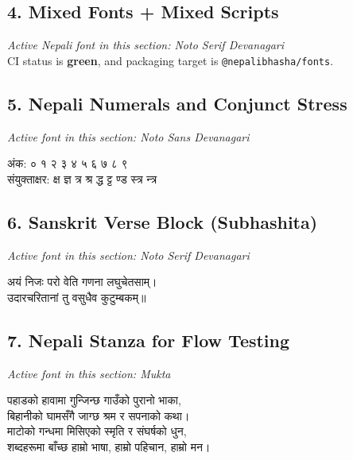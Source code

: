 \documentclass{article}
\begin{document}
\subsection*{4. Mixed Fonts + Mixed Scripts}
\textit{Active Nepali font in this section: Noto Serif Devanagari}\\
{\nepaliserif
{}}
CI status is \textbf{green}, and packaging target is
\texttt{@nepalibhasha/fonts}.

\subsection*{5. Nepali Numerals and Conjunct Stress}
\textit{Active font in this section: Noto Sans Devanagari}\\
\begin{nepali}
अंक: ० १ २ ३ ४ ५ ६ ७ ८ ९\\
संयुक्ताक्षर: क्ष ज्ञ त्र श्र द्ध ट्ट ण्ड स्त्र न्त्र
\end{nepali}

\subsection*{6. Sanskrit Verse Block (Subhashita)}
\textit{Active font in this section: Noto Serif Devanagari}\\
{\nepaliserif
\begin{nepali}
अयं निजः परो वेति गणना लघुचेतसाम्।\\
उदारचरितानां तु वसुधैव कुटुम्बकम्॥
\end{nepali}
}

\subsection*{7. Nepali Stanza for Flow Testing}
\textit{Active font in this section: Mukta}\\
{\nepalimukta
\begin{nepali}
पहाडको हावामा गुन्जिन्छ गाउँको पुरानो भाका,\\
बिहानीको घामसँगै जाग्छ श्रम र सपनाको कथा।\\
माटोको गन्धमा मिसिएको स्मृति र संघर्षको धुन,\\
शब्दहरूमा बाँच्छ हाम्रो भाषा, हाम्रो पहिचान, हाम्रो मन।
\end{nepali}
}
\end{document}
